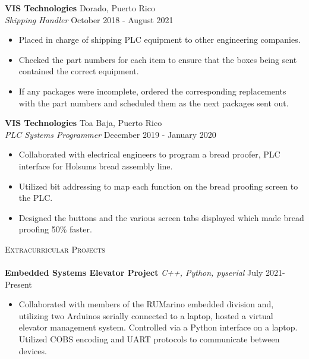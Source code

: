 \documentclass[a4paper]{article}
\newcommand{\lineunder} {
    \vspace*{-8pt} \\
    \hspace*{-18pt} \hrulefill \\
}
\newcommand{\header} [1] {
    {\hspace*{-18pt}\vspace*{6pt} \textsc{#1}}
    \vspace*{-6pt} \lineunder
}
\begin{document}
\textbf{VIS Technologies} \hfill Dorado, Puerto Rico\\
\textit{Shipping Handler} \hfill October 2018 - August 2021\\
\vspace{-2mm}

\begin{itemize} \itemsep -1pt
	\item Placed in charge of shipping PLC equipment to other engineering companies.
	\item Checked the part numbers for each item to ensure that the boxes being sent contained the correct equipment.
	\item If any packages were incomplete, ordered the corresponding replacements with the part numbers and scheduled them as the next packages sent out.
\end{itemize}

\textbf{VIS Technologies} \hfill Toa Baja, Puerto Rico\\
\textit{PLC Systems Programmer} \hfill December 2019 - January 2020\\
\vspace{-2mm}
\begin{itemize} \itemsep -1pt
	\item Collaborated with electrical engineers to program a bread proofer, PLC interface for Holsum\textquotesingle{}s bread assembly line.
	\item Utilized bit addressing to map each function on the bread proofing screen to the PLC.
	\item Designed the buttons and the various screen tabs displayed which made bread proofing 50\% faster.
\end{itemize}

\header{Extracurricular Projects}
{\textbf{Embedded Systems Elevator Project}} {\sl C++, Python, pyserial} \hfill \hfill July 2021-Present\\
\vspace{-1mm}

\begin{itemize} \itemsep -1pt
\item Collaborated with members of the RUMarino embedded division and, utilizing two Arduinos serially connected to a laptop, hosted a virtual elevator management system. Controlled via a Python interface on a laptop. Utilized COBS encoding and UART protocols to communicate between devices.\\
\end{itemize}
\vspace*{-1mm}
\end{document}
